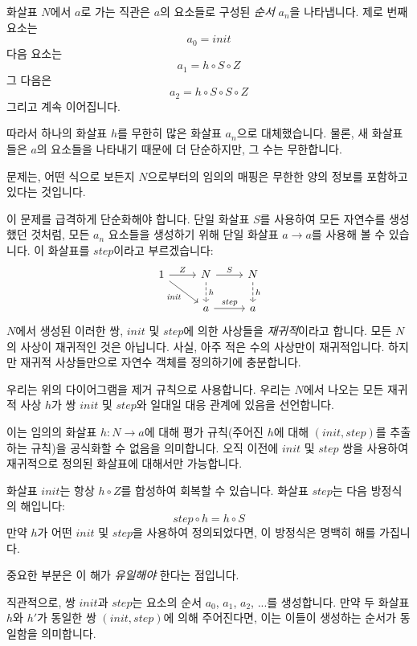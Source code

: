 \documentclass[DaoFP]{subfiles}
\begin{document}
화살표 $N$에서 $a$로 가는 직관은 $a$의 요소들로 구성된 \emph{순서} $a_n$을 나타냅니다. 제로 번째 요소는
\[a_0=\mathit{init}\]
다음 요소는
\[a_1 = h \circ S \circ Z \]
그 다음은
\[a_2 = h \circ S \circ S \circ Z \]
그리고 계속 이어집니다.

따라서 하나의 화살표 $h$를 무한히 많은 화살표 $a_n$으로 대체했습니다. 물론, 새 화살표들은 $a$의 요소들을 나타내기 때문에 더 단순하지만, 그 수는 무한합니다.

문제는, 어떤 식으로 보든지 $N$으로부터의 임의의 매핑은 무한한 양의 정보를 포함하고 있다는 것입니다.

이 문제를 급격하게 단순화해야 합니다. 단일 화살표 $S$를 사용하여 모든 자연수를 생성했던 것처럼, 모든 $a_n$ 요소들을 생성하기 위해 단일 화살표 $a \to a$를 사용해 볼 수 있습니다. 이 화살표를 $\mathit{step}$이라고 부르겠습니다:
\[
 \begin{tikzcd}
 1
 \arrow[r, "Z"]
 \arrow[rd, "\mathit{init}"']
 &N
  \arrow[r, "S"]
\arrow[d, dashed, "h"]
&N
\arrow[d, dashed, "h"]
\\
& a
\arrow[r, "\mathit{step}"]
& a
  \end{tikzcd}
\]
$N$에서 생성된 이러한 쌍, $\mathit{init}$ 및 $\mathit{step}$에 의한 사상들을 \emph{재귀적}이라고 합니다. 모든 $N$의 사상이 재귀적인 것은 아닙니다. 사실, 아주 적은 수의 사상만이 재귀적입니다. 하지만 재귀적 사상들만으로 자연수 객체를 정의하기에 충분합니다.

우리는 위의 다이어그램을 제거 규칙으로 사용합니다. 우리는 $N$에서 나오는 모든 재귀적 사상 $h$가 쌍 $\mathit{init}$ 및 $\mathit{step}$와 일대일 대응 관계에 있음을 선언합니다.

이는 임의의 화살표 $h \colon N \to a$에 대해 평가 규칙(주어진 $h$에 대해 $(\mathit{init}, \mathit{step})$를 추출하는 규칙)을 공식화할 수 없음을 의미합니다. 오직 이전에 $\mathit{init}$ 및 $\mathit{step}$ 쌍을 사용하여 재귀적으로 정의된 화살표에 대해서만 가능합니다.

화살표 $\mathit{init}$는 항상 $h \circ Z$를 합성하여 회복할 수 있습니다. 화살표 $\mathit{step}$는 다음 방정식의 해입니다:
\[ \mathit{step} \circ h = h \circ S \]
만약 $h$가 어떤 $\mathit{init}$ 및 $\mathit{step}$을 사용하여 정의되었다면, 이 방정식은 명백히 해를 가집니다.

중요한 부분은 이 해가 \emph{유일해야} 한다는 점입니다.

직관적으로, 쌍 $\mathit{init}$과 $\mathit{step}$는 요소의 순서 $a_0$, $a_1$, $a_2$, ...를 생성합니다. 만약 두 화살표 $h$와 $h'$가 동일한 쌍 $(\mathit{init}, \mathit{step})$에 의해 주어진다면, 이는 이들이 생성하는 순서가 동일함을 의미합니다.
\end{document}
